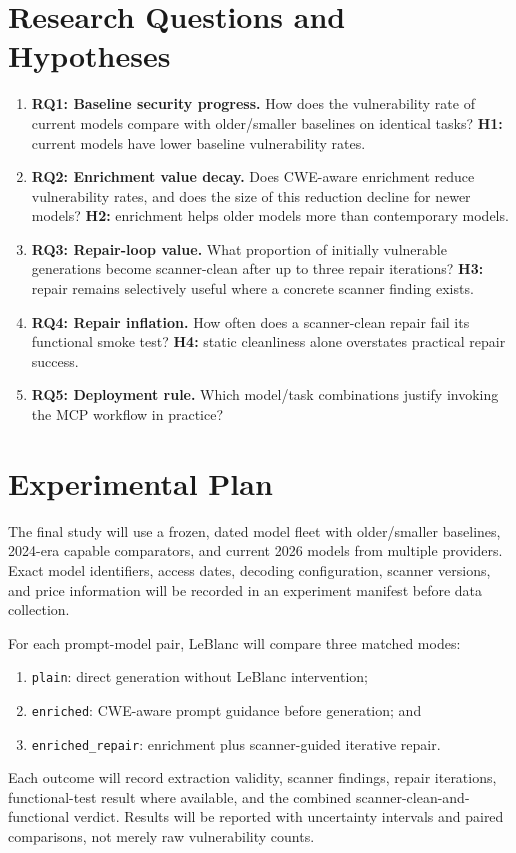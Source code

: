 \documentclass[11pt,a4paper]{article}
\begin{document}
\section{Research Questions and Hypotheses}
\begin{enumerate}
\item \textbf{RQ1: Baseline security progress.} How does the vulnerability rate of current models compare with older/smaller baselines on identical tasks? \textbf{H1:} current models have lower baseline vulnerability rates.
\item \textbf{RQ2: Enrichment value decay.} Does CWE-aware enrichment reduce vulnerability rates, and does the size of this reduction decline for newer models? \textbf{H2:} enrichment helps older models more than contemporary models.
\item \textbf{RQ3: Repair-loop value.} What proportion of initially vulnerable generations become scanner-clean after up to three repair iterations? \textbf{H3:} repair remains selectively useful where a concrete scanner finding exists.
\item \textbf{RQ4: Repair inflation.} How often does a scanner-clean repair fail its functional smoke test? \textbf{H4:} static cleanliness alone overstates practical repair success.
\item \textbf{RQ5: Deployment rule.} Which model/task combinations justify invoking the MCP workflow in practice?
\end{enumerate}

\section{Experimental Plan}
The final study will use a frozen, dated model fleet with older/smaller baselines, 2024-era capable comparators, and current 2026 models from multiple providers. Exact model identifiers, access dates, decoding configuration, scanner versions, and price information will be recorded in an experiment manifest before data collection.

For each prompt-model pair, LeBlanc will compare three matched modes:
\begin{enumerate}
\item \texttt{plain}: direct generation without LeBlanc intervention;
\item \texttt{enriched}: CWE-aware prompt guidance before generation; and
\item \texttt{enriched\_repair}: enrichment plus scanner-guided iterative repair.
\end{enumerate}
Each outcome will record extraction validity, scanner findings, repair iterations, functional-test result where available, and the combined scanner-clean-and-functional verdict. Results will be reported with uncertainty intervals and paired comparisons, not merely raw vulnerability counts.
\end{document}
